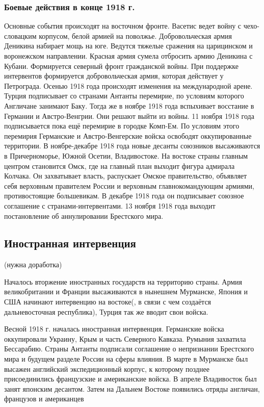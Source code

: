 \subsubsection{Боевые действия в конце 1918 г.}

Основные события происходят на восточном фронте. Васетис ведет войну с чехо-словацким корпусом, белой армией на поволжье.
Добровольческая армия Деникина набирает мощь на юге. 
Ведутся тяжелые сражения на царицинском и воронежском направлении. Красная армия сумела отбросить армию Деникина с Кубани.
Формируется северный фронт гражданской войны. При поддержке интервентов формируется добровольческая армия, которая действует у Петрограда.
Осенью 1918 года происходят изменения на международной арене. Турция подписывает со странами Антанты перемирие, по условиям которого Англичане занимают Баку. Тогда же в ноябре 1918 года вспыхивает восстание в Германии и Австро-Венгрии. Они решают выйти из войны. 11 ноября 1918 года подписывается пока ещё перемирие в городке Комп-Ем. По условиям этого перемирия Германские и Австро-Венгерские войска освободят оккупированные территории.
В ноябре-декабре 1918 года новые десанты союзников высаживаются в Причерноморье, Южной Осетии, Владивостоке.
На востоке страны главным центром становится Омск, где на главный план выходит фигура адмирала Колчака. Он захватывает власть, распускает Омское правительство, объявляет себя верховным правителем России и верховным главнокомандующим армиями, противостоящие большевикам. В декабре 1918 года он подписывает союзное соглашение с странами-интервентами.
13 ноября 1918 года выходит постановление об аннулировании Брестского мира.

\subsection{Иностранная интервенция} (нужна доработка)

Началось вторжение иностранных государств на территорию страны. Армия великобритании и Франции высаживаются в нынешнем Мурманске, Япония и США начинают интервенцию на востоке(, в связи с чем создаётся дальневосточная республика), Турция так же вводит свои войска.

Весной 1918 г. началась иностранная интервенция. Германские войска оккупировали
Украину, Крым и часть Северного Кавказа. Румыния захватила Бессарабию. Страны Антанты
подписали соглашение о непризнании Брестского мира и будущем разделе России на сферы
влияния. В марте в Мурманске был высажен английский экспедиционный корпус, к которому
позднее присоединились французские и американские войска. В апреле Владивосток был занят
японским десантом. Затем на Дальнем Востоке появились отряды англичан, французов и
американцев

